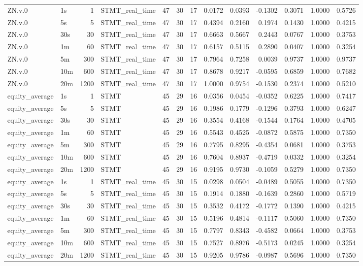 \begin{tabular}{llrlrrrrrrrrr}
ZN.v.0 & 1s & 1 & STMT_real_time & 47 & 30 & 17 & 0.0172 & 0.0393 & -0.1302 & 0.3071 & 1.0000 & 0.5726 \\
ZN.v.0 & 5s & 5 & STMT_real_time & 47 & 30 & 17 & 0.4394 & 0.2160 & 0.1974 & 0.1430 & 1.0000 & 0.4215 \\
ZN.v.0 & 30s & 30 & STMT_real_time & 47 & 30 & 17 & 0.6663 & 0.5667 & 0.2443 & 0.0767 & 1.0000 & 0.3753 \\
ZN.v.0 & 1m & 60 & STMT_real_time & 47 & 30 & 17 & 0.6157 & 0.5115 & 0.2890 & 0.0407 & 1.0000 & 0.3254 \\
ZN.v.0 & 5m & 300 & STMT_real_time & 47 & 30 & 17 & 0.7964 & 0.7258 & 0.0039 & 0.9737 & 1.0000 & 0.9737 \\
ZN.v.0 & 10m & 600 & STMT_real_time & 47 & 30 & 17 & 0.8678 & 0.9217 & -0.0595 & 0.6859 & 1.0000 & 0.7682 \\
ZN.v.0 & 20m & 1200 & STMT_real_time & 47 & 30 & 17 & 1.0000 & 0.9754 & -0.1530 & 0.2374 & 1.0000 & 0.5210 \\
equity_average & 1s & 1 & STMT & 45 & 29 & 16 & 0.0356 & 0.0454 & -0.0352 & 0.6225 & 1.0000 & 0.7417 \\
equity_average & 5s & 5 & STMT & 45 & 29 & 16 & 0.1986 & 0.1779 & -0.1296 & 0.3793 & 1.0000 & 0.6247 \\
equity_average & 30s & 30 & STMT & 45 & 29 & 16 & 0.3554 & 0.4168 & -0.1544 & 0.1764 & 1.0000 & 0.4705 \\
equity_average & 1m & 60 & STMT & 45 & 29 & 16 & 0.5543 & 0.4525 & -0.0872 & 0.5875 & 1.0000 & 0.7350 \\
equity_average & 5m & 300 & STMT & 45 & 29 & 16 & 0.7795 & 0.8295 & -0.4354 & 0.0681 & 1.0000 & 0.3753 \\
equity_average & 10m & 600 & STMT & 45 & 29 & 16 & 0.7604 & 0.8937 & -0.4719 & 0.0332 & 1.0000 & 0.3254 \\
equity_average & 20m & 1200 & STMT & 45 & 29 & 16 & 0.9195 & 0.9730 & -0.1059 & 0.5279 & 1.0000 & 0.7350 \\
equity_average & 1s & 1 & STMT_real_time & 45 & 30 & 15 & 0.0298 & 0.0504 & -0.0489 & 0.5055 & 1.0000 & 0.7350 \\
equity_average & 5s & 5 & STMT_real_time & 45 & 30 & 15 & 0.1914 & 0.1880 & -0.1639 & 0.2860 & 1.0000 & 0.5719 \\
equity_average & 30s & 30 & STMT_real_time & 45 & 30 & 15 & 0.3532 & 0.4172 & -0.1772 & 0.1390 & 1.0000 & 0.4215 \\
equity_average & 1m & 60 & STMT_real_time & 45 & 30 & 15 & 0.5196 & 0.4814 & -0.1117 & 0.5060 & 1.0000 & 0.7350 \\
equity_average & 5m & 300 & STMT_real_time & 45 & 30 & 15 & 0.7797 & 0.8343 & -0.4582 & 0.0664 & 1.0000 & 0.3753 \\
equity_average & 10m & 600 & STMT_real_time & 45 & 30 & 15 & 0.7527 & 0.8976 & -0.5173 & 0.0245 & 1.0000 & 0.3254 \\
equity_average & 20m & 1200 & STMT_real_time & 45 & 30 & 15 & 0.9205 & 0.9786 & -0.0987 & 0.5696 & 1.0000 & 0.7350 \\
\bottomrule
\end{tabular}
